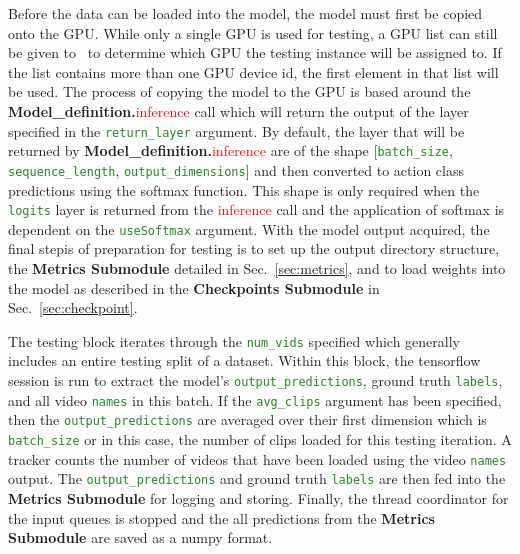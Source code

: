 \documentclass{llncs}
\begin{document}
Before the data can be loaded into the model, the model must first be copied onto the GPU. 
While only a single GPU is used for testing, a GPU list can still be given to \acro~to determine which GPU the testing instance will be assigned to.
If the list contains more than one GPU device id, the first element in that list will be used.
The process of copying the model to the GPU is based around the \textbf{Model\_definition.}\textcolor{red}{inference} call which will return the output of the layer specified in the \texttt{\textcolor{ForestGreen}{return\_layer}} argument.
By default, the layer that will be returned by \textbf{Model\_definition.}\textcolor{red}{inference} are of the shape [\texttt{\textcolor{ForestGreen}{batch\_size}}, \texttt{\textcolor{ForestGreen}{sequence\_length}}, \texttt{\textcolor{ForestGreen}{output\_dimensions}}] and then converted to action class predictions using the softmax function.
This shape is only required when the \texttt{\textcolor{ForestGreen}{logits}} layer is returned from the \textcolor{red}{inference} call and the application of softmax is dependent on the \texttt{\textcolor{ForestGreen}{useSoftmax}} argument.
With the model output acquired, the final stepis of preparation for testing is to set up the output directory structure, the \textbf{Metrics Submodule} detailed in Sec.~\ref{sec:metrics}, and to load weights into the model as described in the \textbf{Checkpoints Submodule} in Sec.~\ref{sec:checkpoint}.

The testing block iterates through the \texttt{\textcolor{ForestGreen}{num\_vids}} specified which generally includes an entire testing split of a dataset.
Within this block, the tensorflow session is run to extract the model's \texttt{\textcolor{ForestGreen}{output\_predictions}}, ground truth \texttt{\textcolor{ForestGreen}{labels}}, and all video \texttt{\textcolor{ForestGreen}{names}} in this batch.
If the \texttt{\textcolor{ForestGreen}{avg\_clips}} argument has been specified, then the \texttt{\textcolor{ForestGreen}{output\_predictions}} are averaged over their first dimension which is \texttt{\textcolor{ForestGreen}{batch\_size}} or in this case, the number of clips loaded for this testing iteration. 
A tracker counts the number of videos that have been loaded using the video \texttt{\textcolor{ForestGreen}{names}} output.
The \texttt{\textcolor{ForestGreen}{output\_predictions}} and ground truth \texttt{\textcolor{ForestGreen}{labels}} are then fed into the \textbf{Metrics Submodule} for logging and storing.
Finally, the thread coordinator for the input queues is stopped and the all predictions from the \textbf{Metrics Submodule} are saved as a numpy format.
\end{document}
